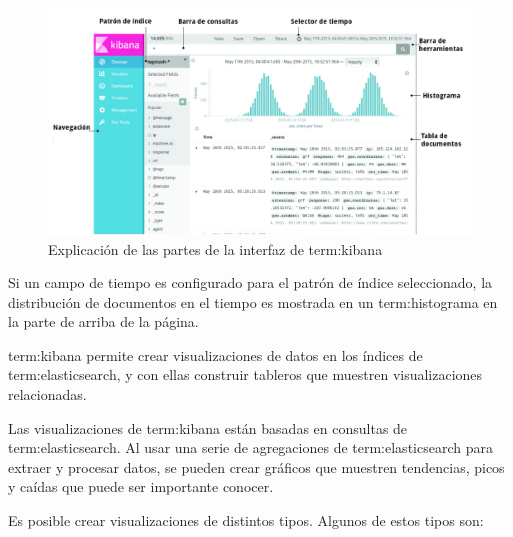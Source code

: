 \begin{figure}
  \includegraphics[width=\linewidth]{src/images/05-capitulo-5/kibana-ux.png}
  \caption{Explicación de las partes de la interfaz de \gls{term:kibana}}
  \label{fig:kibana-ux}
\end{figure}


Si un campo de tiempo es configurado para el patrón de índice seleccionado, la
distribución de documentos en el tiempo es mostrada en un \gls{term:histograma}
en la parte de arriba de la página.

\gls{term:kibana} permite crear visualizaciones de datos en los índices de
\gls{term:elasticsearch}, y con ellas construir tableros que muestren
visualizaciones relacionadas.

Las visualizaciones de \gls{term:kibana} están basadas en consultas de
\gls{term:elasticsearch}. Al usar una serie de agregaciones de
\gls{term:elasticsearch} para extraer y procesar datos, se pueden crear
gráficos que muestren tendencias, picos y caídas que puede ser importante
conocer.

Es posible crear visualizaciones de distintos tipos. Algunos de estos tipos son:


